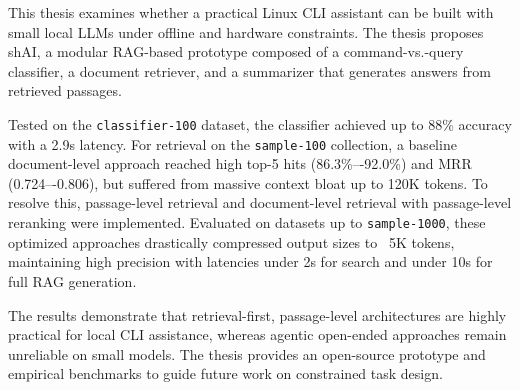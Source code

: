 This thesis examines whether a practical Linux CLI assistant can be built
with small local LLMs under offline and hardware constraints.
The thesis proposes shAI, a modular RAG-based prototype composed of a
command-vs.-query classifier, a document retriever,
and a summarizer that generates answers from retrieved passages.

Tested on the \texttt{classifier-100} dataset, the classifier achieved up to
88\% accuracy with a 2.9s latency. For retrieval on the \texttt{sample-100}
collection, a baseline document-level approach reached high top-5 hits
(86.3\%–-92.0\%) and MRR (0.724–-0.806), but suffered from massive context bloat
up to 120K tokens. To resolve this, passage-level retrieval and document-level
retrieval with passage-level reranking were implemented. Evaluated on datasets
up to \texttt{sample-1000}, these optimized approaches drastically compressed
output sizes to ~5K tokens, maintaining high precision with latencies under 2s
for search and under 10s for full RAG generation.

The results demonstrate that retrieval-first, passage-level architectures are
highly practical for local CLI assistance, whereas agentic open-ended
approaches remain unreliable on small models. The thesis provides an open-source
prototype and empirical benchmarks to guide future work on constrained task
design.
